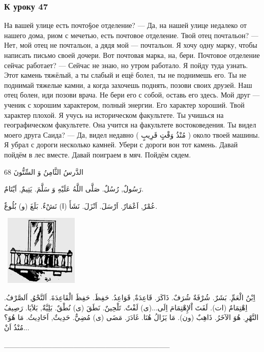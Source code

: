 \documentclass[a5paper]{article}
\begin{document}
\subsubsection{К уроку 47}
На вашей улице есть почто§ое отделение? — Да, на нашей улице недалеко от нашего дома, риом с мечетью, есть почтовое отделение. Твой отец почтальон? — Нет, мой отец не почтальон, а дядя мой — почтальон. Я хочу одну марку, чтобы написать письмо своей дочери. Вот почтовая марка, на, бери. Почтовое отделение сейчас работает? — Сейчас не знаю, но утром работало. Я пойду туда узнать. Этот камень тяжёлый, а ты слабый и ещё болел, ты не поднимешь его. Ты не поднимай тяжелые камни, а когда захочешь поднять, позови своих друзей. Наш отец болен, иди позови врача. Не бери его с собой, оставь его здесь. Мой друг — ученик с хорошим характером, полный энергии. Его характер хороший. Твой характер плохой. Я учусь на историческом факультете. Ты учишься на географическом факультете. Она учится на факультете востоковедения. Ты видел моего друга Саида? — Да, видел недавно ( مُنْذُ وَقْتٍ قَرِيبٍ ) около твоей машины. Я убрал с дороги несколько камней. Убери с дороги вон тот камень. Давай пойдём в лес вместе. Давай поиграем в мяч. Пойдём сядем.

الدَّرسُ الثَّامِنُ وَ السِّتُّونَ 68

رَسُولٌ, رُسُلٌ. صَلَّى اللَّهُ عَلَيْهِ وَ سَلَّمَ. يَتِيمٌ, اَيْتَامٌ. 

عُمْرٌ, اَعْمَارٌ. اَرْسَلَ. اَنْزَلَ. نَشَأَ (ا) نَشْءٌ. بَلَغَ (و) بُلُوغٌ. 

\  \includegraphics[width=1.3783in,height=1.3335in]{MuhammadBagauddinlatinized-img218.png} 

اِبْنُ الْعَمِّ. بَشَرٌ. شُرْفَةٌ شُرَفٌ. ذَاكَرَ. قَاعِدَةٌ, قَوَاعِدُ. حَفِظَ. حَفِظَ الْقَاعِدَةَ. اَلنَّحْوُ.ِ اَلصَّرْفُ. اِهْتِمَامٌ (ات). لَفَتَ اْلإِهْتِمَامَ اِلَى...(ى) لَفْتٌ. تَلْحِينٌ. نَطَقَ (ى) نُطْقٌ. بَلِيَّةٌ, بَلاَيَا. رَصِيفُ النَّهْرِ. هُوَ الآخَرُ. ذَاهِبٌ (ون). مَا يَزَالُ هُنَا. غَادَرَ. مَضَى (ى) مُضِيٌّ. حَدِيثٌ, اَحَادِيثُ. مَا هُوَ؟ مُنْذُ اَنْ...

\_\_\_\_\_\_\_\_\_\_\_\_\_\_\_\_\_\_\_\_\_\_\_\_\_\_\_\_\_\_\_ 
\end{document}
